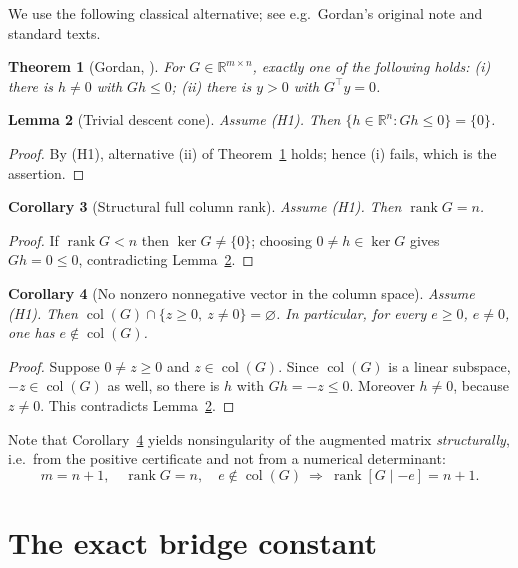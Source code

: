 \documentclass[11pt]{article}
\newtheorem{theorem}{Theorem}[section]
\newtheorem{lemma}[theorem]{Lemma}
\newtheorem{corollary}[theorem]{Corollary}
\theoremstyle{definition}
\newcommand{\R}{\mathbb{R}}
\newcommand{\col}{\operatorname{col}}
\newcommand{\rank}{\operatorname{rank}}
\begin{document}
We use the following classical alternative; see e.g.\ Gordan's original note and standard texts.

\begin{theorem}[Gordan, \cite{Gordan1873,Mangasarian1969}]\label{thm:gordan}
For $G\in\R^{m\times n}$, exactly one of the following holds:
\emph{(i)} there is $h\neq0$ with $Gh\le0$; \emph{(ii)} there is $y>0$ with $G^{\top}y=0$.
\end{theorem}

\begin{lemma}[Trivial descent cone]\label{lem:cone}
Assume \textup{(H1)}. Then $\{h\in\R^n: Gh\le0\}=\{0\}$.
\end{lemma}
\begin{proof}
By \textup{(H1)}, alternative \textup{(ii)} of Theorem~\ref{thm:gordan} holds; hence \textup{(i)}
fails, which is the assertion.
\end{proof}

\begin{corollary}[Structural full column rank]\label{cor:rank}
Assume \textup{(H1)}. Then $\rank G=n$.
\end{corollary}
\begin{proof}
If $\rank G<n$ then $\ker G\neq\{0\}$; choosing $0\neq h\in\ker G$ gives $Gh=0\le0$, contradicting
Lemma~\ref{lem:cone}.
\end{proof}

\begin{corollary}[No nonzero nonnegative vector in the column space]\label{cor:col}
Assume \textup{(H1)}. Then $\col(G)\cap\{z\ge0,\ z\neq0\}=\varnothing$. In particular, for every
$e\ge0$, $e\neq0$, one has $e\notin\col(G)$.
\end{corollary}
\begin{proof}
Suppose $0\neq z\ge0$ and $z\in\col(G)$. Since $\col(G)$ is a linear subspace, $-z\in\col(G)$ as well,
so there is $h$ with $Gh=-z\le0$. Moreover $h\neq0$, because $z\neq0$. This contradicts
Lemma~\ref{lem:cone}.
\end{proof}

Note that Corollary~\ref{cor:col} yields nonsingularity of the augmented matrix \emph{structurally},
i.e.\ from the positive certificate and not from a numerical determinant:
\begin{equation}\label{eq:aug}
m=n+1,\quad \rank G=n,\quad e\notin\col(G)\ \Longrightarrow\ \rank[G\mid -e]=n+1 .
\end{equation}

\section{The exact bridge constant}\label{sec:bridge}
\end{document}
